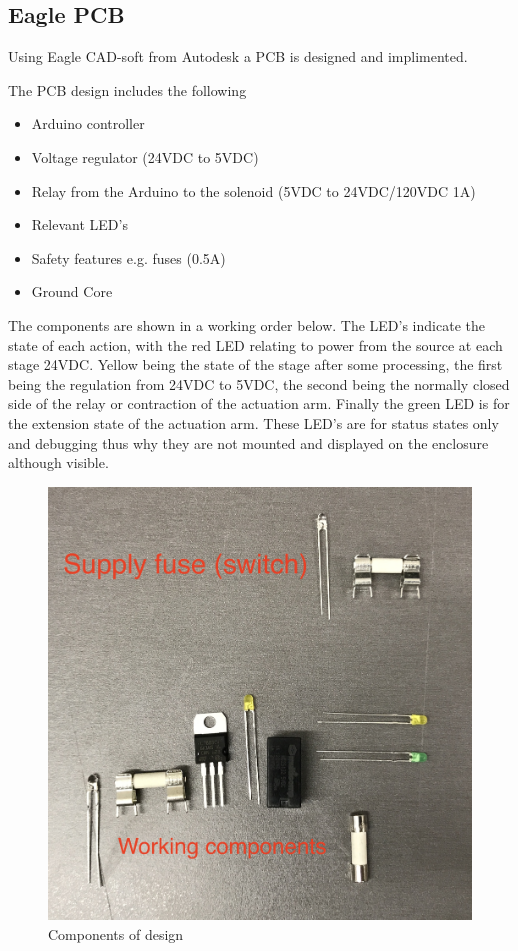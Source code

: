 \documentclass[a4paper, 10pt]{IEEEconf}
\begin{document}
\subsection{Eagle PCB}

Using Eagle CAD-soft from Autodesk \cite{eagle} a PCB is designed and implimented. 

The PCB design includes the following
\begin{itemize}
	\item Arduino controller
	\item Voltage regulator (24VDC to 5VDC)
	\item Relay from the Arduino to the solenoid (5VDC to 24VDC/120VDC 1A)
	\item Relevant LED's
	\item Safety features e.g. fuses (0.5A)
	\item Ground Core
\end{itemize}

The components are shown in a working order below. The LED's indicate the state of each action, with the red LED relating to power from the source at each stage 24VDC. Yellow being the state of the stage after some processing, the first being the regulation from 24VDC to 5VDC, the second being the normally closed side of the relay or contraction of the actuation arm. Finally the green LED is for the extension state of the actuation arm. These LED's are for status states only and debugging thus why they are not mounted and displayed on the enclosure although visible.

\begin{figure}[H]
  \includegraphics[width=\linewidth]{images/parts}
  \caption{Components of design}
  \label{fig:Components of design}
\end{figure}
\end{document}
